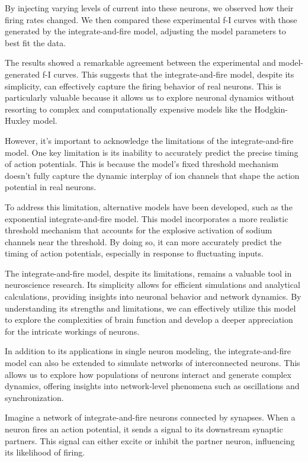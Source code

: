 By injecting varying levels of current into these neurons, we observed how their firing rates changed. We then compared these experimental f-I curves with those generated by the integrate-and-fire model, adjusting the model parameters to best fit the data.

The results showed a remarkable agreement between the experimental and model-generated f-I curves. This suggests that the integrate-and-fire model, despite its simplicity, can effectively capture the firing behavior of real neurons. This is particularly valuable because it allows us to explore neuronal dynamics without resorting to complex and computationally expensive models like the Hodgkin-Huxley model.

However, it's important to acknowledge the limitations of the integrate-and-fire model. One key limitation is its inability to accurately predict the precise timing of action potentials. This is because the model's fixed threshold mechanism doesn't fully capture the dynamic interplay of ion channels that shape the action potential in real neurons.

To address this limitation, alternative models have been developed, such as the exponential integrate-and-fire model. This model incorporates a more realistic threshold mechanism that accounts for the explosive activation of sodium channels near the threshold. By doing so, it can more accurately predict the timing of action potentials, especially in response to fluctuating inputs.

The integrate-and-fire model, despite its limitations, remains a valuable tool in neuroscience research. Its simplicity allows for efficient simulations and analytical calculations, providing insights into neuronal behavior and network dynamics. By understanding its strengths and limitations, we can effectively utilize this model to explore the complexities of brain function and develop a deeper appreciation for the intricate workings of neurons.

In addition to its applications in single neuron modeling, the integrate-and-fire model can also be extended to simulate networks of interconnected neurons. This allows us to explore how populations of neurons interact and generate complex dynamics, offering insights into network-level phenomena such as oscillations and synchronization.

Imagine a network of integrate-and-fire neurons connected by synapses. When a neuron fires an action potential, it sends a signal to its downstream synaptic partners. This signal can either excite or inhibit the partner neuron, influencing its likelihood of firing.

